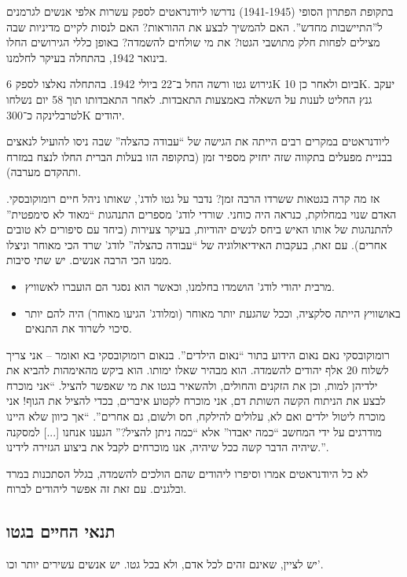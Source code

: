 \documentclass[a4paper]{book}
\begin{document}
	בתקופת הפתרון הסופי (1941-1945) נדרשו ליודנראטים לספק עשרות אלפי אנשים לגרמנים ל''התיישבות מחדש''. האם להמשיך לבצע את ההוראות? האם לנסות לקיים מדיניות שבה מצילים לפחות חלק מתושבי הגטו? את מי שולחים להשמדה? באופן כללי הגירושים החלו בינואר 1942, בהתחלה בעיקר לחלמנו. 
	
	גירוש גטו ורשה החל ב־22 ביולי 1942. בהתחלה נאלצו לספק 6K ביום ולאחר כן 10K. 
	יעקב גנץ החליט לענות על השאלה באמצעות התאבדות. לאחר התאבדותו תוך 58 יום נשלחו לטרבלינקה כ־300K יהודים. 
	
	ליודנראטים במקרים רבים הייתה את הגישה של ``עבודה כהצלה'' שבה ניסו להועיל לנאצים בבניית מפעלים בתקווה שזה יחזיק מספיר זמן (בתקופה הזו בעלות הברית החלו לנצח במזרח ותהקדם מערבה). 
	
	אז מה קרה בגטאות ששרדו הרבה זמן? נדבר על גטו לודג', שאותו ניהל חיים רומוקובסקי. האדם שנוי במחלוקת, כנראה היה כוחני. שורדי לודג' מספרים התנהגות ``מאוד לא סימפטית'' להתנהגות של אותו האיש ביחס לנשים יהודיות, בעיקר צעירות (ביחד עם סיפורים לא טובים אחרים). עם זאת, בעקבות האידיאולוגיה של ``עבודה כהצלה'' לודג' שרד הכי מאוחר וניצלו ממנו הכי הרבה אנשים. יש שתי סיבות. 
	\begin{itemize}
		\item מרבית יהודי לודג' הושמדו בחלמנו, וכאשר הוא נסגר הם הועברו לאשוויץ. 
		\item באושוויץ הייתה סלקציה, וככל שהגעת יותר מאוחר (ומלודג' הגיעו מאוחר) היה להם יותר סיכוי לשרוד את התנאים. 
	\end{itemize}
	רומוקובסקי נאם נאום הידוע בתור ``נאום הילדים''. בנאום רומוקובסקי בא ואומר – אני צריך לשלוח 20 אלף יהודים להשמדה. הוא מבהיר שאלו ימותו. הוא ביקש מהאימהות להביא את ילדיהן למות, וכן את הזקנים והחולים, ולהשאיר בגטו את מי שאפשר להציל. ``אני מוכרח לבצע את הניתוח הקשה השותת דם, אני מוכרח לקטוע איברים, בכדי להציל את הגוף! אני מוכרח ליטול ילדים ואם לא, עלולים להילקח, חס ולשום, גם אחרים''. ``אך כיוון שלא היינו מודרגים על ידי המחשב ``כמה יאבדו'' אלא ``כמה ניתן להציל?'' הגענו אנחנו [...] למסקנה שיהיה הדבר קשה ככל שיהיה, אנו מוכרחים לקבל את ביצוע הגזירה לידינו.''. 
	
	לא כל היודנראטים אמרו וסיפרו ליהודים שהם הולכים להשמדה, בגלל הסתכנות במרד ובלגנים. עם זאת זה אפשר ליהודים לברוח. 
	
	
	
	
	
	\subsection{תנאי החיים בגטו}
	יש לציין, שאינם זהים לכל אדם, ולא בכל גטו. יש אנשים עשירים יותר וכו'. 
	
\end{document}
